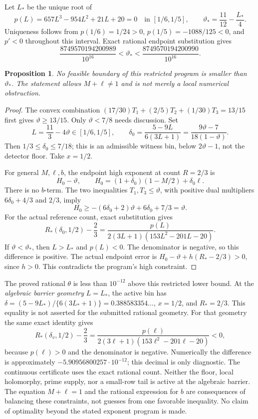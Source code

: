 \documentclass[12pt]{article}
\newtheorem{proposition}[theorem]{Proposition}
\begin{document}
Let \(L_*\) be the unique root of
\[
 p(L)=657L^3-954L^2+21L+20=0
       \quad\text{in }[1/6,1/5],
 \qquad \vartheta_*=\frac{11}{12}-\frac{L_*}{4}.
\]
Uniqueness follows from \(p(1/6)=1/24>0\),
\(p(1/5)=-1088/125<0\), and \(p'<0\) throughout this interval.
Exact rational endpoint substitution gives
\begin{equation}\label{eq:root-isolation}
 \frac{8749570194200989}{10^{16}}
 <\vartheta_*<
 \frac{8749570194200990}{10^{16}}.
\end{equation}

\begin{proposition}\label{prop:restricted-barrier}
No feasible boundary of this restricted program is smaller
than \(\vartheta_*\).
The statement allows \(M+\ell\ne1\) and is not merely a local
numerical obstruction.
\end{proposition}
\begin{proof}
The convex combination
\((17/30)T_1+(2/5)T_2+(1/30)T_3=13/15\)
first gives \(\vartheta\ge13/15\).
Only \(\vartheta<7/8\) needs discussion.
Set
\[
 L=\frac{11}{3}-4\vartheta\in[1/6,1/5],\qquad
 \delta_0=\frac{5-9L}{6(3L+1)}
          =\frac{9\vartheta-7}{18(1-\vartheta)}.
\]
Then \(1/3\le\delta_0\le7/18\); this is an admissible witness
bin, below \(2\vartheta-1\), not the detector floor.
Take \(x=1/2\).

For general \(M,\ell,b\), the endpoint high exponent at count
\(R=2/3\) is
\[
 H_0-\vartheta,\qquad
 H_0=(1+\delta_0)(1-M/2)+\delta_0\ell .
\]
There is no \(b\)-term.
The two inequalities \(T_1,T_3\le\vartheta\), with positive
dual multipliers \(6\delta_0+4/3\) and \(2/3\), imply
\[
 H_0\ge -(6\delta_0+2)\vartheta+6\delta_0+7/3
       =\vartheta.
\]
For the actual reference count, exact substitution gives
\[
 R_*(\delta_0,1/2)-\frac23
 =\frac{p(L)}
        {2(3L+1)(153L^2-201L-20)}.
\]
If \(\vartheta<\vartheta_*\), then \(L>L_*\) and \(p(L)<0\).
The denominator is negative, so this difference is positive.
The actual endpoint error is
\(H_0-\vartheta+h(R_*-2/3)>0\), since \(h>0\).
This contradicts the program's high constraint.
\end{proof}

The proved rational \(\theta\) is less than \(10^{-12}\) above
this restricted lower bound.  At the \emph{algebraic barrier geometry}
\(L=L_*\), the active bin has
\(\delta=(5-9L_*)/\{6(3L_*+1)\}=0.388583354\ldots\),
\(x=1/2\), and \(R_*=2/3\).
This equality is not asserted for the submitted rational geometry.
For that geometry the same exact identity gives
\[
 R_*(\delta_v,1/2)-\frac23
 =\frac{p(\ell)}
 {2(3\ell+1)(153\ell^2-201\ell-20)}<0,
\]
because \(p(\ell)>0\) and the denominator is negative.
Numerically the difference is approximately
\(-5.90956800257\cdot10^{-12}\); this decimal is only diagnostic.
The continuous certificate uses the exact rational count.
Neither the floor, local holomorphy, prime supply, nor a
small-row tail is active at the algebraic barrier.
The equation \(M+\ell=1\) and the rational expression for \(b\)
are consequences of balancing these constraints, not guesses
from one favorable inequality.
No claim of optimality beyond the stated exponent program is made.
\end{document}
